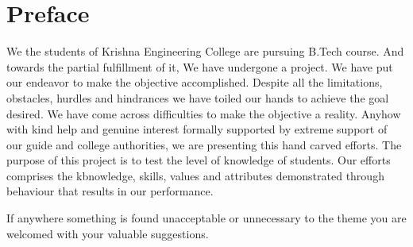 \chapter*{Preface}
We the students of Krishna Engineering College are pursuing B.Tech course. And towards the partial
fulfillment of it, We have undergone a project. We have put our endeavor to make the objective
accomplished. Despite all the limitations, obstacles, hurdles and hindrances we have toiled our hands
to achieve the goal desired. We have come across difficulties to make the objective a reality. Anyhow
with kind help and genuine interest formally supported by extreme support of our guide and college
authorities, we are presenting this hand carved efforts. The purpose of this project is to test the level of
knowledge of students. Our efforts comprises the kbnowledge, skills, values and attributes
demonstrated through behaviour that results in our performance.
\vspace{.5cm}

If anywhere something is found unacceptable or unnecessary to the theme you are welcomed with your
valuable suggestions.